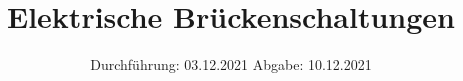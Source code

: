 

\subject{VERSUCH 302}
\title{Elektrische Brückenschaltungen}
\date{%
  Durchführung: 03.12.2021
  \hspace{3em}
  Abgabe: 10.12.2021
}



\maketitle
\thispagestyle{empty}
\tableofcontents
\newpage






\printbibliography{}



